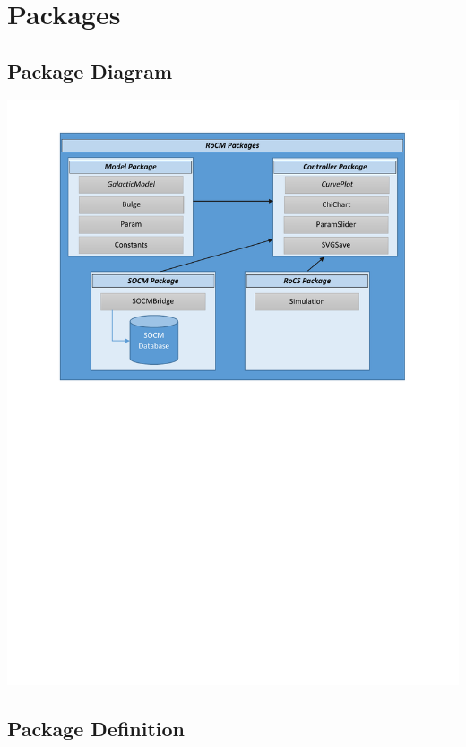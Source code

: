 \documentclass[titlepage]{article}
\begin{document}
\section{Packages}
\subsection{Package Diagram}
\begin{center}
	\includegraphics[trim={2cm 14cm 1cm 1cm},clip,scale=1]{package_diagram.pdf}
\end{center}

\newpage

\subsection{Package Definition}
\end{document}
